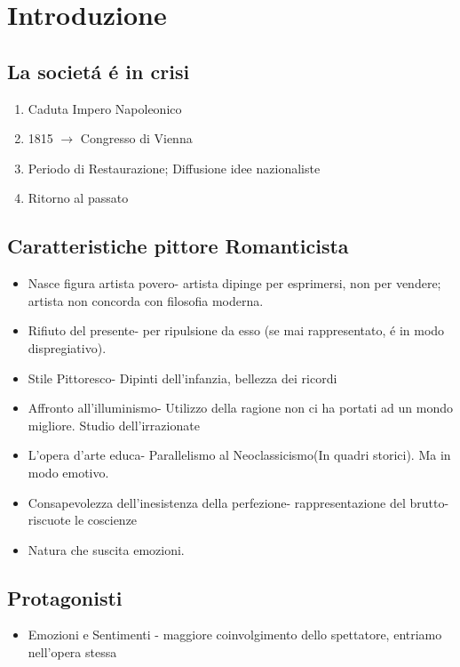 \documentclass{article}
\title{\jobname}
\author{Eugenio Animali}
\begin{document}
\maketitle

\section{Introduzione}
\subsection{La societá é in crisi}
\begin{enumerate}
    \item Caduta Impero Napoleonico
    \item 1815 $\to$ Congresso di Vienna
    \item Periodo di Restaurazione; Diffusione idee nazionaliste
    \item Ritorno al passato
\end{enumerate}
\subsection*{Caratteristiche pittore Romanticista}
\begin{itemize}
    \item Nasce figura artista povero- artista dipinge per esprimersi, non per vendere; artista non concorda con filosofia moderna.
    \item Rifiuto del presente- per ripulsione da esso (se mai rappresentato, é in modo dispregiativo).
    \item Stile Pittoresco- Dipinti dell'infanzia, bellezza dei ricordi
    \item Affronto all'illuminismo- Utilizzo della ragione non ci ha portati ad un mondo migliore. Studio dell'irrazionate
    \item L'opera d'arte educa- Parallelismo al Neoclassicismo(In quadri storici). Ma in modo emotivo.
    \item Consapevolezza dell'inesistenza della perfezione- rappresentazione del brutto- riscuote le coscienze
    \item Natura che suscita emozioni.
\end{itemize}
\subsection*{Protagonisti}
\begin{itemize}
\item Emozioni e Sentimenti - maggiore coinvolgimento dello spettatore, entriamo nell'opera stessa
\end{itemize}
\end{document}
